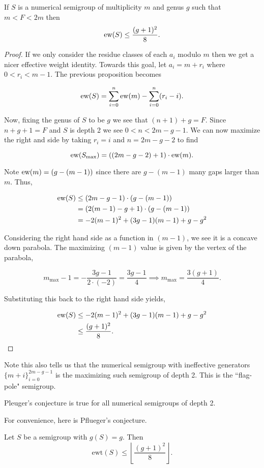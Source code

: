 \documentclass[11pt]{article}
\begin{document}
\newpage
\begin{proposition}
    If \(S\) is a numerical semigroup of multiplicity \(m\) and genus \(g\) such that \(m < F < 2 m\) then 
    \[\text{ew}(S) \le \frac{(g+1)^2}{8}.\]
\end{proposition}
\begin{proof}
If we only consider the residue classes of each \(a_i\) modulo \(m\) then we get a nicer effective weight identity. Towards this goal, let \(a_i = m + r_i\) where \(0 < r_i < m - 1\). The previous proposition becomes

\[\text{ew}(S) = \sum\limits_{i=0}^n \text{ew}(m) - \sum\limits_{i=0}^n (r_i - i).\]

Now, fixing the genus of \(S\) to be \(g\) we see that \((n + 1) + g = F\). Since \(n + g + 1 = F\) and \(S\) is depth 2 we see \(0 < n < 2m - g - 1\).
We can now maximize the right and side by taking \(r_i = i\) and \(n = 2m - g - 2\) to find 

\[\text{ew}(S_{\text{max}}) = ((2m - g - 2) + 1) \cdot \text{ew}(m).\]


Note \(\text{ew}(m) = (g - (m-1))\) since there are \(g - (m-1)\) many gaps larger than \(m\). Thus, 

\begin{align*}
    \text{ew}(S) &\le (2m -g - 1) \cdot (g - (m-1)) \\
    &= (2(m-1) -g + 1) \cdot (g - (m-1))  \\
    &= -2(m-1)^2 + (3g - 1) (m-1) + g - g^2
\end{align*}

Considering the right hand side as a function in \((m-1)\), we see it is a concave down parabola. The maximizing \((m - 1)\) value is given by the vertex of the parabola,

\[m_{\text{max}} - 1 = -\frac{3g - 1}{2 \cdot (-2)} = \frac{3g - 1}{4} \implies m_{\text{max}} = \frac{3(g+1)}{4}.\]

Substituting this back to the right hand side yields,

\begin{align*}
    \text{ew}(S) &\le -2(m-1)^2 + (3g - 1) (m-1) + g - g^2\\
    &\le \frac{(g+1)^2}{8}.
\end{align*}
\end{proof}

Note this also tells us that the numerical semigroup with ineffective generators \(\{m + i\}_{i=0}^{2m-g-1}\) is the maximizing such semigroup of depth 2. This is the ``flag-pole" semigroup.

\begin{corollary}
    Pleuger's conjecture is true for all numerical semigroups of depth 2.
\end{corollary}

For convenience, here is Pflueger's conjecture.

\begin{conjecture}
    Let \( S \) be a semigroup with \( g(S) = g \). Then
    \[
    \text{ewt}(S) \leq \left\lfloor \frac{(g + 1)^2}{8} \right\rfloor.
    \]
\end{conjecture}



\end{document}

